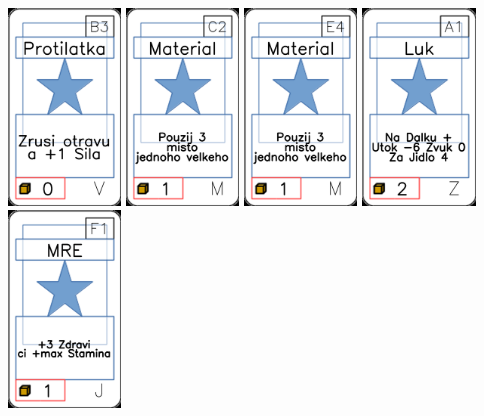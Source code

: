 \documentclass[a4paper]{article}
\begin{document}
	\includegraphics[width=3.0cm]{img-1_67}
	\includegraphics[width=3.0cm]{img-1_41}
	\includegraphics[width=3.0cm]{img-1_53}
	\includegraphics[width=3.0cm]{img-1_90}
	\includegraphics[width=3.0cm]{img-1_25}
\end{document}

